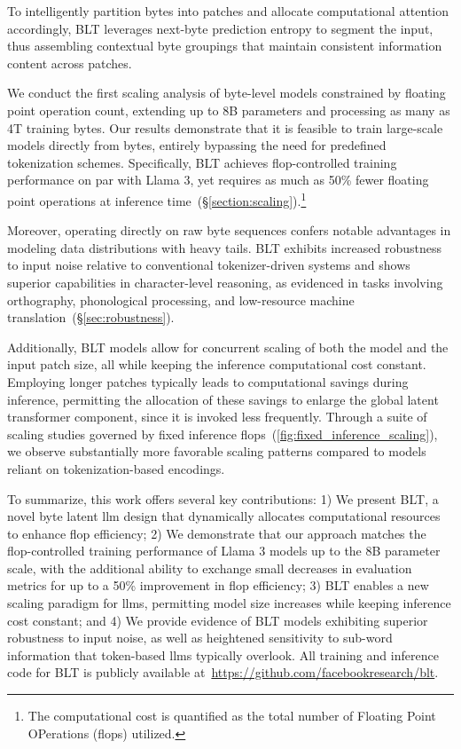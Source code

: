 To intelligently partition bytes into patches and allocate computational attention accordingly, {\textsc BLT} leverages next-byte prediction entropy to segment the input, thus assembling contextual byte groupings that maintain consistent information content across patches.

We conduct the first scaling analysis of byte-level models constrained by floating point operation count, extending up to 8B parameters and processing as many as 4T training bytes. Our results demonstrate that it is feasible to train large-scale models directly from bytes, entirely bypassing the need for predefined tokenization schemes. Specifically, {\textsc BLT} achieves flop-controlled training performance on par with Llama 3, yet requires as much as 50\% fewer floating point operations at inference time~(\S\ref{section:scaling}).\footnote{The computational cost is quantified as the total number of Floating Point OPerations (flops) utilized.} 

Moreover, operating directly on raw byte sequences confers notable advantages in modeling data distributions with heavy tails. {\textsc BLT} exhibits increased robustness to input noise relative to conventional tokenizer-driven systems and shows superior capabilities in character-level reasoning, as evidenced in tasks involving orthography, phonological processing, and low-resource machine translation~(\S\ref{sec:robustness}).

Additionally, {\textsc BLT} models allow for concurrent scaling of both the model and the input patch size, all while keeping the inference computational cost constant. Employing longer patches typically leads to computational savings during inference, permitting the allocation of these savings to enlarge the global latent transformer component, since it is invoked less frequently. Through a suite of scaling studies governed by fixed inference flops~(\autoref{fig:fixed_inference_scaling}), we observe substantially more favorable scaling patterns compared to models reliant on tokenization-based encodings.

To summarize, this work offers several key contributions: 1) We present {\textsc BLT}, a novel byte latent llm design that dynamically allocates computational resources to enhance flop efficiency; 2) We demonstrate that our approach matches the flop-controlled training performance of Llama 3 models up to the 8B parameter scale, with the additional ability to exchange small decreases in evaluation metrics for up to a 50\% improvement in flop efficiency; 3) {\textsc BLT} enables a new scaling paradigm for llms, permitting model size increases while keeping inference cost constant; and 4) We provide evidence of {\textsc BLT} models exhibiting superior robustness to input noise, as well as heightened sensitivity to sub-word information that token-based llms typically overlook. All training and inference code for {\textsc BLT} is publicly available at~\url{https://github.com/facebookresearch/blt}.


